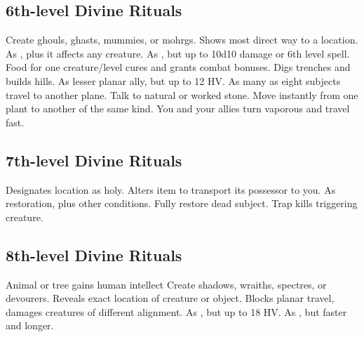 \subsection{6th-level Divine Rituals}
\begin{rituallist}
 Create ghouls, ghasts, mummies, or mohrgs.
 Shows most direct way to a location.
 As , plus it affects any creature.
 As , but up to 10d10 damage or 6th level spell.
 Food for one creature/level cures and grants combat bonuses.
 Digs trenches and builds hills.
 As lesser planar ally, but up to 12 HV.
\F As many as eight subjects travel to another plane.
 Talk to natural or worked stone.
 Move instantly from one plant to another of the same kind.
 You and your allies turn vaporous and travel fast.
\end{rituallist}

\subsection{7th-level Divine Rituals}
\begin{rituallist}
 Designates location as holy.
 Alters item to transport its possessor to you.
 As restoration, plus other conditions.
 Fully restore dead subject.
 Trap kills triggering creature.
\end{rituallist}

\subsection{8th-level Divine Rituals}
\begin{rituallist}
 Animal or tree gains human intellect
 Create shadows, wraiths, spectres, or devourers.
 Reveals exact location of creature or object.
 Blocks planar travel, damages creatures of different alignment.
 As , but up to 18 HV.
 As , but faster and longer.
\end{rituallist}

